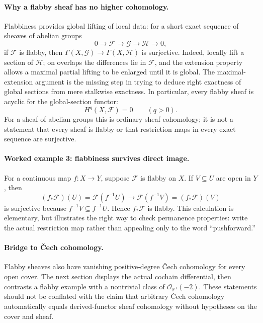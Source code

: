 \paragraph{Why a flabby sheaf has no higher cohomology.}
Flabbiness provides global lifting of local data: for a short exact
sequence of sheaves of abelian groups
\[
 0\longrightarrow\mathcal F\longrightarrow\mathcal G
 \longrightarrow\mathcal H\longrightarrow0,
\]
if $\mathcal F$ is flabby, then
$\Gamma(X,\mathcal G)\to\Gamma(X,\mathcal H)$ is surjective.
Indeed, locally lift a section of $\mathcal H$; on overlaps the
differences lie in $\mathcal F$, and the extension property
allows a maximal partial lifting to be enlarged until it is
global.  The maximal-extension argument is the missing step in
trying to deduce right exactness of global sections from mere
stalkwise exactness.  In particular, every flabby sheaf is
acyclic for the global-section functor:
\[
 H^q(X,\mathcal F)=0\qquad(q>0).
\]
For a sheaf of abelian groups this is ordinary sheaf cohomology;
it is not a statement that every sheaf is flabby or that
restriction maps in every exact sequence are surjective.

\paragraph{Worked example 3: flabbiness survives direct image.}
For a continuous map $f:X\to Y$, suppose $\mathcal F$ is flabby
on $X$.  If $V\subseteq U$ are open in $Y$, then
\[
 (f_*\mathcal F)(U)=\mathcal F(f^{-1}U)
 \longrightarrow\mathcal F(f^{-1}V)=(f_*\mathcal F)(V)
\]
is surjective because $f^{-1}V\subseteq f^{-1}U$.  Hence
$f_*\mathcal F$ is flabby.  This calculation is elementary,
but illustrates the right way to check permanence properties:
write the actual restriction map rather than appealing only
to the word ``pushforward.''

\paragraph{Bridge to \v{C}ech cohomology.}
Flabby sheaves also have vanishing positive-degree \v{C}ech
cohomology for every open cover.  The next section displays the
actual cochain differential, then contrasts a flabby example
with a nontrivial class of $\mathcal O_{\mathbb P^1}(-2)$.
These statements should not be conflated with the claim that
arbitrary \v{C}ech cohomology automatically equals derived-functor
sheaf cohomology without hypotheses on the cover and sheaf.
